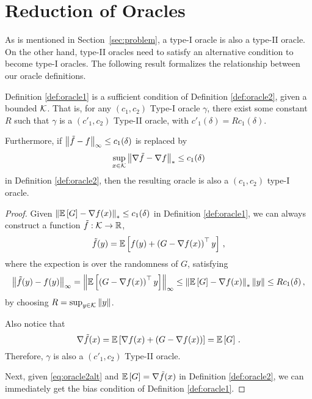 
\section{Reduction of Oracles}
\label{sec:orrel}

As is mentioned in Section~\ref{sec:problem}, a type-I oracle is also a type-II oracle. On the other hand, type-II oracles need to satisfy an alternative condition to become type-I oracles. The following result formalizes the relationship between our oracle definitions.
\begin{theorem}\label{thm:typered}
Definition \ref{def:oracle1} is a sufficient condition of Definition \ref{def:oracle2}, given a bounded $\mathcal{K}$. That is, for any $(c_1,c_2)$ Type-I oracle $\gamma$, there exist some constant $R$ such that  $\gamma$ is a $(c'_1,c_2)$ Type-II oracle, with $c'_1(\delta)=Rc_1(\delta)$.

Furthermore, if $\left\|\tilde{f}-f\right\|_\infty \le c_1(\delta)$ is replaced by 
\begin{align}
\label{eq:oracle2alt}
\sup_{x\in \mathcal{K}}\left\|\nabla \tilde{f}- \nabla f\right\|_* \le c_1(\delta)
\end{align}
in Definition \ref{def:oracle2}, then the resulting oracle is also a $(c_1,c_2)$ type-I oracle.
\end{theorem}

\begin{proof}
Given $\left\| \mathbb{E}\left[G\right]  - \nabla f(x)  \right\|_* \le c_1(\delta) $ in Definition \ref{def:oracle1}, we can always construct a function $\tilde{f}:\mathcal{K} \to \mathbb{R}$,
\[
\tilde{f}(y) =\mathbb{E}\left[ f(y)+ \left( G-\nabla f(x) \right)^\top y\right] \,,
\]
where the expection is over the randomness of $G$, satisfying
\begin{align*}
\left\|\tilde{f}(y)-f(y)\right\|_{\infty}
=
 \left\| \mathbb{E}\left[\left( G-\nabla f(x) \right)^\top y\right]\right\|_{\infty}
 \le \left\|\mathbb{E}\left[G\right]-\nabla f(x)\right\|_* \left\|y\right\|
 \le  Rc_1(\delta)\,,
\end{align*}
by choosing $R = \sup_{y \in \mathcal{K}}\left\|y\right\|$.

Also notice that
\[
 \nabla \tilde{f}(x) = \mathbb{E}\left[\nabla f(x)+ \left( G-\nabla f(x)\right)\right]
 =\mathbb{E}\left[G\right]\,.
\]
Therefore, $\gamma$ is also a $(c'_1,c_2)$ Type-II oracle.

Next, given \eqref{eq:oracle2alt} and $\mathbb{E}\left[G\right]=\nabla \tilde{f}(x)$ in Definition \ref{def:oracle2}, we can immediately get the bias condition of Definition \ref{def:oracle1}.
\end{proof}


